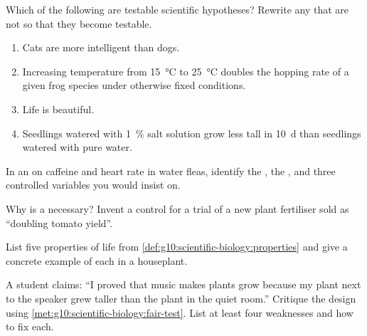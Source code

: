 \begin{exercise}[$\star$]\label{exo:g10:scientific-biology:2}
Which of the following are testable scientific hypotheses? Rewrite any
that are not so that they become testable.
\begin{enumerate}
  \item Cats are more intelligent than dogs.
  \item Increasing temperature from \qty{15}{\celsius} to
        \qty{25}{\celsius} doubles the hopping rate of a given frog
        species under otherwise fixed conditions.
  \item Life is beautiful.
  \item Seedlings watered with \qty{1}{\percent} salt solution grow
        less tall in \qty{10}{d} than seedlings watered with pure water.
\end{enumerate}
\end{exercise}

\begin{exercise}[$\star$]\label{exo:g10:scientific-biology:3}
In an  on caffeine and heart rate in water fleas, identify
the , the , and three controlled
variables you would insist on.
\end{exercise}

\begin{exercise}[$\star$]\label{exo:g10:scientific-biology:4}
Why is a  necessary? Invent a control for a trial of a new
plant fertiliser sold as ``doubling tomato yield''.
\end{exercise}

\begin{exercise}[$\star$]\label{exo:g10:scientific-biology:5}
List five properties of life from \cref{def:g10:scientific-biology:properties}
and give a concrete example of each in a houseplant.
\end{exercise}

\begin{exercise}[$\star\star$]\label{exo:g10:scientific-biology:6}
A student claims: ``I proved that music makes plants grow because my
plant next to the speaker grew taller than the plant in the quiet
room.'' Critique the design using \cref{met:g10:scientific-biology:fair-test}.
List at least four weaknesses and how to fix each.
\end{exercise}

